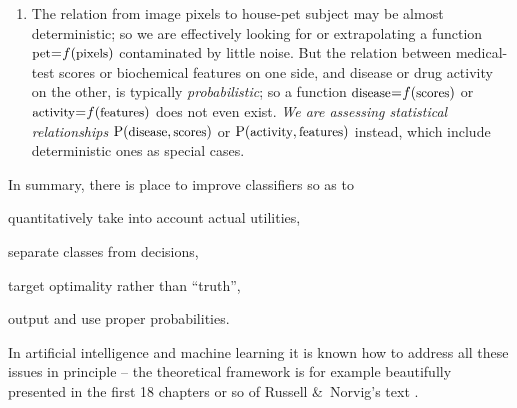 \documentclass[a4paper,12pt,%
onecolumn,oneside,article,%
british%
]{memoir}
\newcommand*{\amp}{\&}
\renewcommand*{\P}{\mathrm{P}}%
\renewcommand*{\|}[1][]{\nonscript\:#1\vert\nonscript\:\mathopen{}}
\newcommand*{\mo}[1][=]{\mathclose{}\mathord{\nonscript\mkern0.5mu#1\nonscript\mkern0.5mu}\mathopen{}}
\newcommand*{\texts}[1]{\text{\small #1}}
\begin{document}
\begin{enumerate}[label=(\roman*)]
  
\item\label{item:determ_statist} The relation from image pixels to house-pet subject may be almost deterministic; so we are effectively looking for or extrapolating a function $\texts{pet} \mo f(\texts{pixels})$ contaminated by little noise. But the relation between medical-test scores or biochemical features on one side, and disease or drug activity on the other, is typically \emph{probabilistic}; so a function $\texts{disease} \mo f(\texts{scores})$
  or $\texts{activity} \mo f(\texts{features})$
  does not even exist. \emph{We are assessing statistical relationships} $\P(\texts{disease} , \texts{scores})$ or $\P(\texts{activity} , \texts{features})$ instead, which include deterministic ones as special cases.

\end{enumerate}

In summary, there is place to improve classifiers so as to
\begin{enumerate*}[label=(\roman*)]
\item quantitatively take into account actual utilities,
\item separate classes from decisions,
\item target optimality rather than \enquote{truth}, %
\item output and use proper probabilities.
\end{enumerate*}

\medskip

In artificial intelligence and machine learning it is known how to address all these issues in principle -- the theoretical framework is for example beautifully presented in the first 18 chapters or so of Russell \amp\ Norvig's \cites*{russelletal1995_r2022} text \autocites[see also][]{selfetal1987,cheeseman1988,cheeseman1995_r2018,pearl1988,mackay1995_r2005}.
\end{document}
